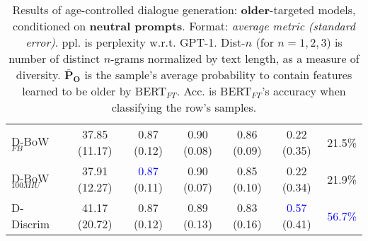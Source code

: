 \begin{table*}[h]
{\begin{tabular}{l | c c c c | c c }
    D-BoW$_{FB}$ & 37.85 (11.17) & 0.87 (0.12) & 0.90 (0.08) & 0.86 (0.09) & 0.22 (0.35) & 21.5\%\\
    D-BoW$_{100MIU}$ & 37.91 (12.27) & \textcolor{blue}{0.87} (0.11) & 0.90 (0.07) & 0.85 (0.10) & 0.22 (0.34) & 21.9\%\\
    \midrule
    D-Discrim & 41.17 (20.72) & 0.87 (0.12) & 0.89 (0.13) & 0.83 (0.16) & \textcolor{blue}{0.57} (0.41) & \textcolor{blue}{56.7\%}\\
    \bottomrule
    \end{tabular}
    }
    \caption{Results of age-controlled dialogue generation: \textbf{older}-targeted models, conditioned on \textbf{neutral prompts}. Format: \textit{average metric (standard error)}. ppl. is perplexity w.r.t. GPT-1. Dist-$n$ (for $n = 1, 2, 3$) is number of distinct $n$-grams normalized by text length, as a measure of diversity. $\boldsymbol{\bar{P}_O}$ is the sample's average probability to contain features learned to be older by BERT$_{FT}$. Acc. is BERT$_{FT}$'s accuracy when classifying the row's samples.}
    \label{tab:ctg_results_ws_neutral_prompt_old_model}
\end{table*}


